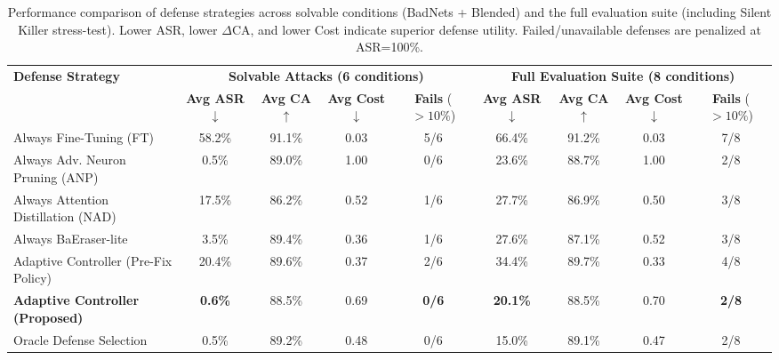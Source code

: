 \begin{table}[t]
\centering
\small
\caption{Performance comparison of defense strategies across solvable conditions (BadNets + Blended) and the full evaluation suite (including Silent Killer stress-test). Lower ASR, lower $\Delta$CA, and lower Cost indicate superior defense utility. Failed/unavailable defenses are penalized at ASR=100\%.}
\label{tab:strategy_comparison}
\begin{tabular}{l | cccc | cccc}
\hline
\multirow{2}{*}{\textbf{Defense Strategy}} & \multicolumn{4}{c|}{\textbf{Solvable Attacks (6 conditions)}} & \multicolumn{4}{c}{\textbf{Full Evaluation Suite (8 conditions)}} \\
 & \textbf{Avg ASR} $\downarrow$ & \textbf{Avg CA} $\uparrow$ & \textbf{Avg Cost} $\downarrow$ & \textbf{Fails} ($>10\%$) & \textbf{Avg ASR} $\downarrow$ & \textbf{Avg CA} $\uparrow$ & \textbf{Avg Cost} $\downarrow$ & \textbf{Fails} ($>10\%$) \\
\hline
Always Fine-Tuning (FT) & 58.2\% & 91.1\% & 0.03 & 5/6 & 66.4\% & 91.2\% & 0.03 & 7/8 \\
Always Adv. Neuron Pruning (ANP) & 0.5\% & 89.0\% & 1.00 & 0/6 & 23.6\% & 88.7\% & 1.00 & 2/8 \\
Always Attention Distillation (NAD) & 17.5\% & 86.2\% & 0.52 & 1/6 & 27.7\% & 86.9\% & 0.50 & 3/8 \\
Always BaEraser-lite & 3.5\% & 89.4\% & 0.36 & 1/6 & 27.6\% & 87.1\% & 0.52 & 3/8 \\
Adaptive Controller (Pre-Fix Policy) & 20.4\% & 89.6\% & 0.37 & 2/6 & 34.4\% & 89.7\% & 0.33 & 4/8 \\
\textbf{Adaptive Controller (Proposed)} & \textbf{0.6\%} & 88.5\% & 0.69 & \textbf{0/6} & \textbf{20.1\%} & 88.5\% & 0.70 & \textbf{2/8} \\
Oracle Defense Selection & 0.5\% & 89.2\% & 0.48 & 0/6 & 15.0\% & 89.1\% & 0.47 & 2/8 \\
\hline
\end{tabular}
\end{table}
